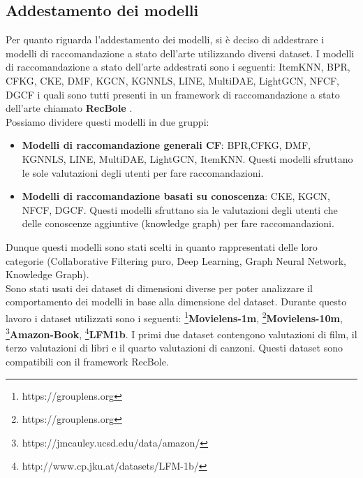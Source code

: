 \subsection{Addestamento dei modelli}

Per quanto riguarda l'addestamento dei modelli, si è deciso di addestrare i modelli di raccomandazione a stato dell'arte utilizzando diversi dataset. I modelli di raccomandazione a stato dell'arte addestrati sono i seguenti: ItemKNN, BPR, CFKG, CKE, DMF, KGCN, KGNNLS, LINE, MultiDAE, LightGCN, NFCF, DGCF i quali sono tutti presenti in un framework di raccomandazione a stato dell'arte chiamato \textbf{RecBole} \cite{recbole}.\\
Possiamo dividere questi modelli in due gruppi:
\begin{itemize}
    \item \textbf{Modelli di raccomandazione generali CF}: BPR,CFKG, DMF, KGNNLS, LINE, MultiDAE, LightGCN, ItemKNN. Questi modelli sfruttano le sole valutazioni degli utenti per fare raccomandazioni.
    \item \textbf{Modelli di raccomandazione basati su conoscenza}: CKE, KGCN, NFCF, DGCF. Questi modelli sfruttano sia le valutazioni degli utenti che delle conoscenze aggiuntive (knowledge graph) per fare raccomandazioni.
\end{itemize}
\noindent Dunque questi modelli sono stati scelti in quanto rappresentati delle loro categorie (Collaborative Filtering puro, Deep Learning, Graph Neural Network, Knowledge Graph).\\ 
Sono stati usati dei dataset di dimensioni diverse per poter analizzare il comportamento dei modelli in base alla dimensione del dataset. Durante questo lavoro i dataset utilizzati sono i seguenti: \footnote{https://grouplens.org}{\textbf{Movielens-1m}}, \footnote{https://grouplens.org}{\textbf{Movielens-10m}}, \footnote{https://jmcauley.ucsd.edu/data/amazon/}{\textbf{Amazon-Book}}, \footnote{http://www.cp.jku.at/datasets/LFM-1b/}{\textbf{LFM1b}}. I primi due dataset contengono valutazioni di film, il terzo valutazioni di libri e il quarto valutazioni di canzoni. Questi dataset sono compatibili con il framework RecBole.



